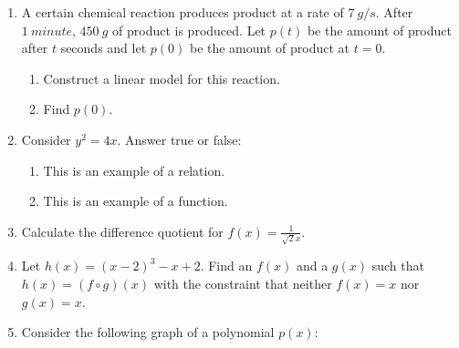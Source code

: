 \documentclass[letterpaper,12pt,fleqn]{article}
\begin{document}
\begin{enumerate}
\item A certain chemical reaction produces product at a rate of $\SI{7}{g/s}$.
  After $\SI{1}{minute}$, $\SI{450}{g}$ of product is produced. Let $p(t)$ be
  the amount of product after $t$ seconds and let $p(0)$ be the amount of
  product at $t=0$.
  \begin{enumerate}
  \item Construct a linear model for this reaction.

    \vspace{1in}
    
  \item Find $p(0)$.
  \end{enumerate}

  \vspace{2in}

\item Consider $y^2=4x$. Answer true or false:
  \begin{enumerate}
  \item This is an example of a relation.
    
    \bigskip

  \item This is an example of a function.
  \end{enumerate}

  \bigskip

  \newpage

\item Calculate the difference quotient for $f(x)=\frac{1}{\sqrt{2}x}$.

  \vspace{3in}

\item Let $h(x)=(x-2)^3-x+2$. Find an $f(x)$ and a $g(x)$ such that
  $h(x)=(f\circ g)(x)$ with the constraint that neither $f(x)=x$ nor
  $g(x)=x$.

  \newpage
  
\item Consider the following graph of a polynomial $p(x)$:



\end{enumerate}
\end{document}

